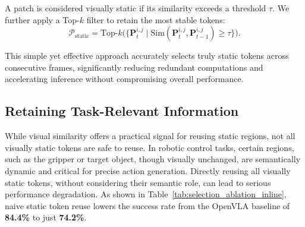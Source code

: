 A patch is considered visually static if its similarity exceeds a threshold \(\tau\). We further apply a Top-\(k\) filter to retain the most stable tokens:
\begin{equation}
\label{eq:topk}
\mathcal{P}_{\mathrm{static}} = \mathrm{Top}\text{-}k\Big(\{ \mathbf{P}_t^{i,j} \mid \mathrm{Sim}(\mathbf{P}_t^{i,j}, \mathbf{P}_{t-1}^{i,j}) \ge \tau \}\Big).
\end{equation}

This simple yet effective approach accurately selects truly static tokens across consecutive frames, significantly reducing redundant computations and accelerating inference without compromising overall performance.

\begin{table}
\centering
\vspace{-0.9cm}
\caption{Comparison of VLA-Cache's core token selection strategies on OpenVLA using the LIBERO Spatial benchmark.}
\small
{}
\label{tab:selection_ablation_inline}
\vspace{-0.45cm}
\end{table}
\subsection{Retaining Task-Relevant Information}
\label{sec:task_filtering}

While visual similarity offers a practical signal for reusing static regions, not all visually static tokens are safe to reuse. In robotic control tasks, certain regions, such as the gripper or target object, though visually unchanged, are semantically dynamic and critical for precise action generation. Directly reusing all visually static tokens, without considering their semantic role, can lead to serious performance degradation. As shown in Table~\ref{tab:selection_ablation_inline}, naive static token reuse lowers the success rate from the OpenVLA baseline of \textbf{84.4\%} to just \textbf{74.2\%}. 

